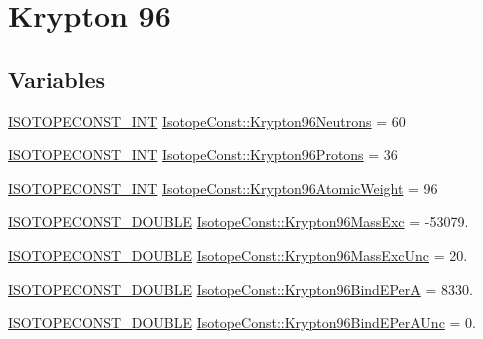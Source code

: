\hypertarget{group___isotope_const-_krypton-_kr96}{}\section{Krypton 96}
\label{group___isotope_const-_krypton-_kr96}
\subsection*{Variables}
\begin{DoxyCompactItemize}
\item 
\mbox{\hyperlink{group___isotope_const-_macros_ga5f18360b3e99483a35c32d789e62621c}{I\+S\+O\+T\+O\+P\+E\+C\+O\+N\+S\+T\+\_\+\+I\+NT}} \mbox{\hyperlink{group___isotope_const-_krypton-_kr96_gae122921704650e51aee67cb574e416d8}{Isotope\+Const\+::\+Krypton96\+Neutrons}} = 60
\item 
\mbox{\hyperlink{group___isotope_const-_macros_ga5f18360b3e99483a35c32d789e62621c}{I\+S\+O\+T\+O\+P\+E\+C\+O\+N\+S\+T\+\_\+\+I\+NT}} \mbox{\hyperlink{group___isotope_const-_krypton-_kr96_ga1eb276d6bcfb10210e3b78b7291bdb0c}{Isotope\+Const\+::\+Krypton96\+Protons}} = 36
\item 
\mbox{\hyperlink{group___isotope_const-_macros_ga5f18360b3e99483a35c32d789e62621c}{I\+S\+O\+T\+O\+P\+E\+C\+O\+N\+S\+T\+\_\+\+I\+NT}} \mbox{\hyperlink{group___isotope_const-_krypton-_kr96_ga7329bb9232df3b77d9b003c67cfd0d58}{Isotope\+Const\+::\+Krypton96\+Atomic\+Weight}} = 96
\item 
\mbox{\hyperlink{group___isotope_const-_macros_ga8f45a7272ce02c0b4c65c44636ed719a}{I\+S\+O\+T\+O\+P\+E\+C\+O\+N\+S\+T\+\_\+\+D\+O\+U\+B\+LE}} \mbox{\hyperlink{group___isotope_const-_krypton-_kr96_gafc73ae8742c04efacc086f4900e55acc}{Isotope\+Const\+::\+Krypton96\+Mass\+Exc}} = -\/53079.
\item 
\mbox{\hyperlink{group___isotope_const-_macros_ga8f45a7272ce02c0b4c65c44636ed719a}{I\+S\+O\+T\+O\+P\+E\+C\+O\+N\+S\+T\+\_\+\+D\+O\+U\+B\+LE}} \mbox{\hyperlink{group___isotope_const-_krypton-_kr96_gaf5babafdb4523c610bd8b5fbbb2f3201}{Isotope\+Const\+::\+Krypton96\+Mass\+Exc\+Unc}} = 20.
\item 
\mbox{\hyperlink{group___isotope_const-_macros_ga8f45a7272ce02c0b4c65c44636ed719a}{I\+S\+O\+T\+O\+P\+E\+C\+O\+N\+S\+T\+\_\+\+D\+O\+U\+B\+LE}} \mbox{\hyperlink{group___isotope_const-_krypton-_kr96_ga5efdb46cd902ee2fde4b87f4d894f8fb}{Isotope\+Const\+::\+Krypton96\+Bind\+E\+PerA}} = 8330.
\item 
\mbox{\hyperlink{group___isotope_const-_macros_ga8f45a7272ce02c0b4c65c44636ed719a}{I\+S\+O\+T\+O\+P\+E\+C\+O\+N\+S\+T\+\_\+\+D\+O\+U\+B\+LE}} \mbox{\hyperlink{group___isotope_const-_krypton-_kr96_ga19c4abf73df1f036bf3e9c396c1a7410}{Isotope\+Const\+::\+Krypton96\+Bind\+E\+Per\+A\+Unc}} = 0.

\end{DoxyCompactItemize}
